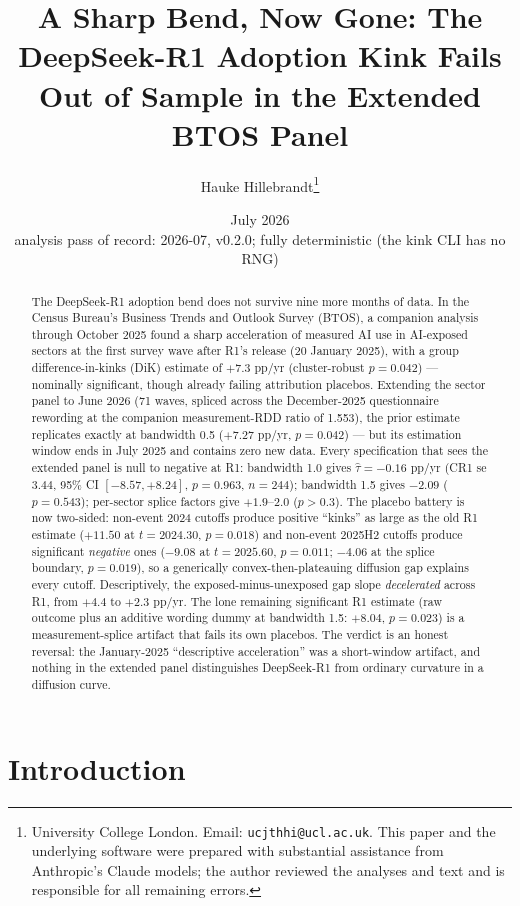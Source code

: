 \documentclass[11pt]{article}
\title{A Sharp Bend, Now Gone: The DeepSeek-R1 Adoption Kink Fails Out of
Sample in the Extended BTOS Panel}
\author{Hauke Hillebrandt\thanks{University College London. Email:
\texttt{ucjthhi@ucl.ac.uk}. This paper and the underlying \natex{} software were
prepared with substantial assistance from Anthropic's Claude models; the author
reviewed the analyses and text and is responsible for all remaining errors.}}
\date{July 2026 \\ \small analysis pass of record: 2026-07, \natex{} v0.2.0;
fully deterministic (the kink CLI has no RNG)}
\begin{document}
\maketitle

\begin{abstract}
\noindent The DeepSeek-R1 adoption bend does not survive nine more months of
data. In the Census Bureau's Business Trends and Outlook Survey (BTOS), a
companion analysis through October 2025 found a sharp acceleration of measured
AI use in AI-exposed sectors at the first survey wave after R1's release
(20 January 2025), with a group difference-in-kinks (DiK) estimate of $+7.3$
pp/yr (cluster-robust $p=0.042$) --- nominally significant, though already
failing attribution placebos. Extending the sector panel to June 2026 (71
waves, spliced across the December-2025 questionnaire rewording at the
companion measurement-RDD ratio of 1.553), the prior estimate replicates
exactly at bandwidth 0.5 ($+7.27$ pp/yr, $p=0.042$) --- but its estimation
window ends in July 2025 and contains zero new data. Every specification that
sees the extended panel is null to negative at R1: bandwidth 1.0 gives
$\hat\tau=-0.16$ pp/yr (CR1 se $3.44$, 95\% CI $[-8.57, +8.24]$, $p=0.963$,
$n=244$); bandwidth 1.5 gives $-2.09$ ($p=0.543$); per-sector splice factors
give $+1.9$--$2.0$ ($p>0.3$). The placebo battery is now two-sided: non-event
2024 cutoffs produce positive ``kinks'' as large as the old R1 estimate
($+11.50$ at $t=2024.30$, $p=0.018$) and non-event 2025H2 cutoffs produce
significant \emph{negative} ones ($-9.08$ at $t=2025.60$, $p=0.011$; $-4.06$
at the splice boundary, $p=0.019$), so a generically convex-then-plateauing
diffusion gap explains every cutoff. Descriptively, the exposed-minus-unexposed
gap slope \emph{decelerated} across R1, from $+4.4$ to $+2.3$ pp/yr. The lone
remaining significant R1 estimate (raw outcome plus an additive wording dummy
at bandwidth 1.5: $+8.04$, $p=0.023$) is a measurement-splice artifact that
fails its own placebos. The verdict is an honest reversal: the January-2025
``descriptive acceleration'' was a short-window artifact, and nothing in the
extended panel distinguishes DeepSeek-R1 from ordinary curvature in a
diffusion curve.
\end{abstract}

\section{Introduction}\label{sec:intro}
\end{document}
